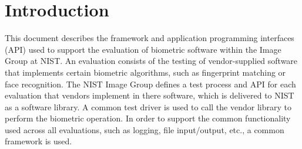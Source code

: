 \chapter{Introduction}

This document describes the framework and application programming interfaces
(API) used to support the evaluation of biometric software within the Image
Group at NIST. An evaluation consists of the testing of vendor-supplied
software that implements certain biometric algorithms, such as fingerprint
matching or face recognition. The NIST Image Group defines a test process
and API for each evaluation that vendors implement in there software, which
is delivered to NIST as a software library. A common test driver is used to
call the vendor library to perform the biometric operation.
In order to support the common functionality used across all evaluations, such
as logging, file input/output, etc., a common framework is used.
